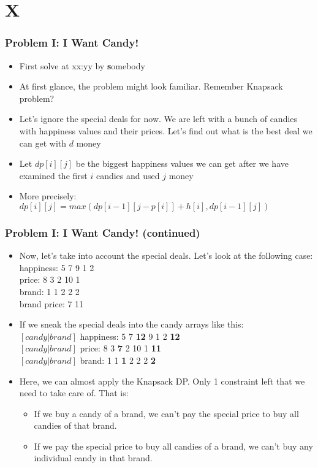 \section{X}%
\label{sec:X}

\begin{frame}
  \frametitle{Problem I: I Want Candy!}
  \begin{itemize}
    \item First solve at xx:yy by \textbf somebody
    \item At first glance, the problem might look familiar. Remember Knapsack problem?
    \item Let's ignore the special deals for now. We are left with a bunch of candies with happiness values and their prices. Let's find out what is the best deal we can get with $d$ money
    \item Let $dp[i][j]$ be the biggest happiness values we can get after we have examined the first $i$ candies and used $j$ money
    \item More precisely: $dp[i][j] = max(dp[i-1][j-p[i]]+h[i],dp[i-1][j])$
  \end{itemize}
\end{frame}

\begin{frame}
  \frametitle{Problem I: I Want Candy! (continued)}
   \begin{itemize}
    \item Now, let's take into account the special deals. Let's look at the following case:\\
        happiness: 5 7 9 1 2\\
        price: 8 3 2 10 1\\
        brand: 1 1 2 2 2\\
        brand price: 7 11\\
    \item If we sneak the special deals into the candy arrays like this:\\
        $[candy|brand]$ happiness: 5 7 \textbf{12} 9 1 2 \textbf{12}\\
        $[candy|brand]$ price: 8 3 \textbf{7} 2 10 1 \textbf{11}\\
        $[candy|brand]$ brand: 1 1 \textbf{1} 2 2 2 \textbf{2}\\
    \item Here, we can almost apply the Knapsack DP. Only 1 constraint left that we need to take care of. That is:
    \begin{itemize}
        \item If we buy a candy of a brand, we can't pay the special price to buy all candies of that brand. 
        \item If we pay the special price to buy all candies of a brand, we can't buy any individual candy in that brand.
    \end{itemize}
  \end{itemize}
\end{frame}

